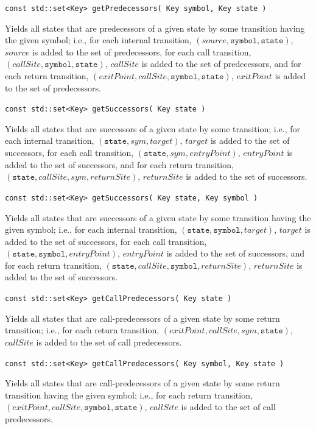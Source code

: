 \documentclass{llncs}
\begin{document}
\begin{description}
  \item\texttt{const std::set<Key> getPredecessors( Key symbol, Key state )}

    Yields all states that are predecessors of a given state by some transition having the given symbol; i.e., for each internal transition, $(source,\texttt{symbol},\texttt{state})$, $source$ is added to the set of predecessors, for each call transition, $(callSite,\texttt{symbol},\texttt{state})$, $callSite$ is added to the set of predecessors, and for each return transition, $(exitPoint,callSite,\texttt{symbol},\texttt{state})$, $exitPoint$ is added to the set of predecessors.

  \item\texttt{const std::set<Key> getSuccessors( Key state )}

    Yields all states that are successors of a given state by some transition; i.e., for each internal transition, $(\texttt{state},sym,target)$, $target$ is added to the set of successors, for each call transition, $(\texttt{state},sym,entryPoint)$, $entryPoint$ is added to the set of successors, and for each return transition, $(\texttt{state},callSite,sym,returnSite)$, $returnSite$ is added to the set of successors.

  \item\texttt{const std::set<Key> getSuccessors( Key state, Key symbol )}

    Yields all states that are successors of a given state by some transition having the given symbol; i.e., for each internal transition, $(\texttt{state},\texttt{symbol},target)$, $target$ is added to the set of successors, for each call transition, $(\texttt{state},\texttt{symbol},entryPoint)$, $entryPoint$ is added to the set of successors, and for each return transition, $(\texttt{state},callSite,\texttt{symbol},returnSite)$, $returnSite$ is added to the set of successors.

  \item\texttt{const std::set<Key> getCallPredecessors( Key state )}

    Yields all states that are call-predecessors of a given state by some return transition; i.e., for each return transition, $(exitPoint,callSite,sym,\texttt{state})$, $callSite$ is added to the set of call predecessors.

  \item\texttt{const std::set<Key> getCallPredecessors( Key symbol, Key state )}

    Yields all states that are call-predecessors of a given state by some return transition having the given symbol; i.e., for each return transition, $(exitPoint,callSite,\texttt{symbol},\texttt{state})$, $callSite$ is added to the set of call predecessors.


\end{description}
\end{document}
